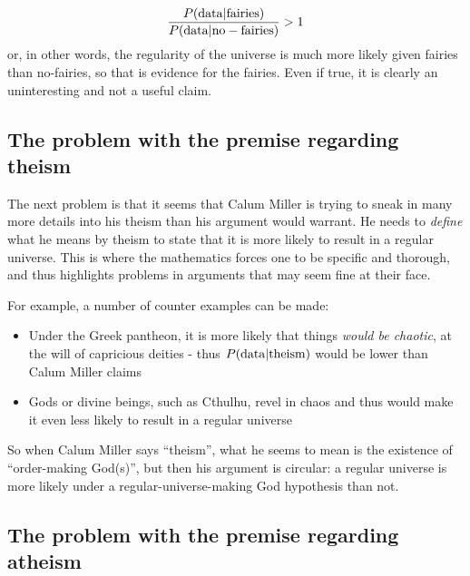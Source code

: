 \begin{eqnarray*}
\frac{P({\rm data}|{\rm fairies})}{P({\rm data}|{\rm no-fairies})}>1
\end{eqnarray*}
or, in other words, the regularity of the universe is much more likely given fairies than no-fairies, so that is evidence for the fairies. Even if true, it is clearly an uninteresting and not a useful claim.

\subsection{The problem with the premise regarding
theism}\label{the-problem-with-the-premise-regarding-theism}


The next problem is that it seems that Calum Miller is  trying
to sneak in many more details into his theism than his argument would
warrant. He needs to \emph{define} what he means by theism to state that
it is more likely to result in a regular universe. This is where the mathematics forces one to be specific and thorough, and thus highlights problems in arguments that may seem fine at their face.

For example, a number of counter examples can be made:

\begin{itemize}
\item  Under the Greek pantheon, it is more likely that things {\em would be chaotic}, at the will of capricious deities - thus $P({\rm data}|{\rm theism})$ would be lower than Calum Miller claims
\item  Gods or divine beings, such as Cthulhu, revel in chaos and thus would make it even less likely to result in a regular universe
\end{itemize}

So when Calum Miller says ``theism'', what he seems to mean is the existence of ``order-making God(s)'', but then his argument is circular: a regular universe is more likely under a regular-universe-making God hypothesis than not.

\subsection{The problem with the premise regarding
atheism}\label{the-problem-with-the-premise-regarding-atheism}

